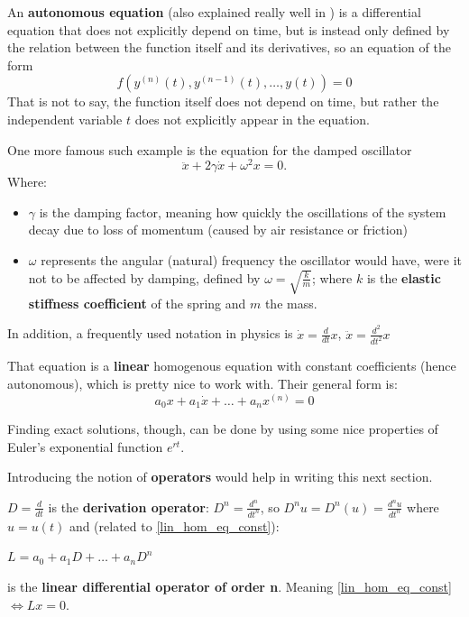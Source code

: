 \begin{definition}
	An \textbf{autonomous equation} (also explained really well in \cite{Hiroki2015} ) is a differential equation that does not explicitly depend on time, but is instead only defined by the relation between the function itself and its derivatives, so an equation of the form
	\begin{equation}\label{eq:3.2.3}
		f(y^{(n)}(t), y^{(n-1)}(t), \dots, y(t))= 0
	\end{equation}
	That is not to say, the function itself does not depend on time, but rather the independent variable $t$ does not explicitly appear in the equation.
\end{definition}

One more famous such example is the equation for the damped oscillator
\begin{equation}\label{eq:3.2.4}
	\ddot{x} + 2\gamma\dot{x} + \omega^2x = 0.
\end{equation}
Where:
\begin{itemize}
	\item $\gamma$ is the damping factor, meaning how quickly the oscillations of the system decay due to loss of momentum (caused by air resistance or friction)

	\item $\omega$ represents the angular (natural) frequency the oscillator would have, were it not to be affected by damping, defined by
		$\omega = \sqrt{\frac{k}{m}}$; where $k$ is the \textbf{elastic stiffness coefficient} of the spring and $m$ the mass.
\end{itemize}

In addition, a frequently used notation in physics is
$\dot{x} = \frac{d}{dt}x$, $\ddot{x}=\frac{d^2}{dt^2}x$

That equation is a \textbf{linear} homogenous equation with constant coefficients (hence autonomous), which is pretty nice to work with. Their general form is:
\begin{equation}\label{lin_hom_eq_const}
	a_0 x + a_1\dot{x}+ \dots +a_{n} x^{(n)} = 0
\end{equation}

Finding exact solutions, though, can be done by using some nice properties of Euler's exponential function $e^{rt}$.

Introducing the notion of \textbf{operators} would help in writing this next section.

\begin{definition}
	$D = \frac{d}{dt}$ is the \textbf{derivation operator}:
	$D^n = \frac{d^n}{dt^n}$, so $D^nu = D^n(u) =\frac{d^nu}{dt^n}$ where $u=u(t)$ and (related to \ref{lin_hom_eq_const}): \par
	\hspace{20pt} $L = a_0 + a_1D + \dots + a_nD^n$ \par
	\hspace{20pt} is the \textbf{linear differential operator of order n}. Meaning \ref{lin_hom_eq_const} $\iff Lx=0$.
\end{definition}

